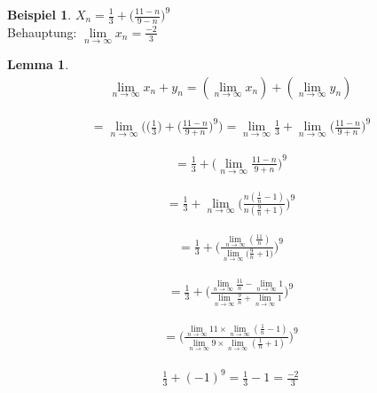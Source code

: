 \documentclass[a4paper,12pt,leqno]{report}
\theoremstyle{plain} %
\newtheorem{lemma}[theorem]{Lemma}
\theoremstyle{definition} %
\newtheorem{example}[theorem]{Beispiel}
\begin{document}
\begin{example}
$X_n = \frac{1}{3} + \big(\frac{11-n}{9-n}\big)^9$\\


Behauptung: $\lim\limits_{n \rightarrow \infty}{x_n}=\frac{-2}{3}$

\begin{lemma}
\begin{gather}
\lim\limits_{n \rightarrow \infty}{x_n+y_n}= 
(\lim\limits_{n \rightarrow \infty}{x_n}) + 
(\lim\limits_{n \rightarrow \infty}{y_n})    
\end{gather}
\end{lemma}

\begin{gather}
=\lim\limits_{n \rightarrow \infty}{\bigg(\big(\frac{1}{3}\big)+\bigg(\frac{11-n}{9+n}\bigg)^9\bigg)} 
= \lim\limits_{n \rightarrow \infty}{\frac{1}{3}+
\lim\limits_{n \rightarrow \infty}{\bigg(\frac{11-n}{9+n}\bigg)^9}}
\end{gather}

\begin{gather}
= \frac{1}{3} + \bigg(\lim\limits_{n \rightarrow \infty}{\frac{11-n}{9+n}}\bigg)^9
\end{gather}


\begin{gather}
= \frac{1}{3} + \lim\limits_{n \rightarrow \infty}{\Bigg(\frac{n(\frac{1}{n}-1)}{n(\frac{9}{n}+1)}\Bigg)^9}
\end{gather}
 
\begin{gather}
= \frac{1}{3}+\Bigg(\frac{\lim\limits_{n \rightarrow \infty}{(\frac{11}{n})}}{\lim\limits_{n \rightarrow \infty}{(\frac{9}{n}+1})}\Bigg)^9
\end{gather}

\begin{gather}
= \frac{1}{3} + \Bigg( 
\frac{\lim\limits_{n \rightarrow \infty}{\frac{11}{n}} - \lim\limits_{n \rightarrow \infty}{1}}{\lim\limits_{n \rightarrow \infty}{\frac{9}{n}+\lim\limits_{n \rightarrow \infty}{1} } }   \Bigg)^9
\end{gather}


\begin{gather}
=\Bigg( 
\frac{\lim\limits_{n \rightarrow \infty}{11} \times \lim\limits_{n \rightarrow \infty}{(\frac{1}{n}-1)}}{\lim\limits_{n \rightarrow \infty}{9 \times \lim\limits_{n \rightarrow \infty}{(\frac{1}{n}+1)} } }   \Bigg)^9
\end{gather}

\begin{gather}
\frac{1}{3}+(-1)^9 = \frac{1}{3}-1 = \frac{-2}{3}
\end{gather}
\end{example}
\end{document}
